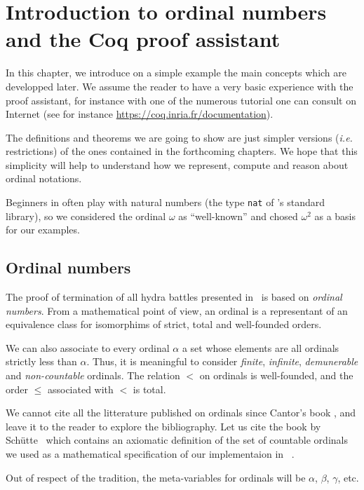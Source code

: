 \chapter{Introduction to ordinal numbers and the Coq proof assistant}

In this chapter, we introduce on a simple example the main concepts which are developped later. We assume the reader to have a very basic experience with the \coq{} proof assistant, for instance with one of the numerous tutorial one can consult on Internet
(see for instance \url{https://coq.inria.fr/documentation}). 

The definitions  and theorems we are going to show are just simpler versions (\emph{i.e.} restrictions) of the ones contained in the forthcoming chapters. We hope that this simplicity will help to understand how we represent, compute and reason about ordinal notations.

Beginners in \coq{} often play with natural numbers (the type \texttt{nat} of \coq's 
standard library), so we considered the ordinal  $\omega$ as ``well-known'' and chosed 
$\omega^2$ as a basis for our examples.



\section{Ordinal numbers}

The proof of termination of all hydra battles presented in~\cite{KP82} is based
on \emph{ordinal numbers}.
From a mathematical point of view, an ordinal is a representant of an equivalence class for isomorphims of strict, total and well-founded orders.

We can also associate to every ordinal $\alpha$ a set whose elements are all ordinals strictly less than $\alpha$. Thus, it is meaningful  to consider \emph{finite}, \emph{infinite}, \emph{demunerable} and \emph{non-countable} ordinals.
The relation $<$ on ordinals is well-founded, and the order $\leq$ associated with
$<$ is total.

We cannot cite all the litterature published on ordinals since Cantor's book 
\cite{cantorbook}, and 
leave it to the reader to explore the bibliography. Let us cite the book by Schütte~\cite{schutte} which contains an axiomatic definition of the set of countable ordinals we used as a mathematical specification of our implementaion in \coq{}~\cite{CantorContrib}. 


Out of respect of the tradition, the meta-variables for ordinals will be 
 $\alpha$, $\beta$, $\gamma$, etc. 

